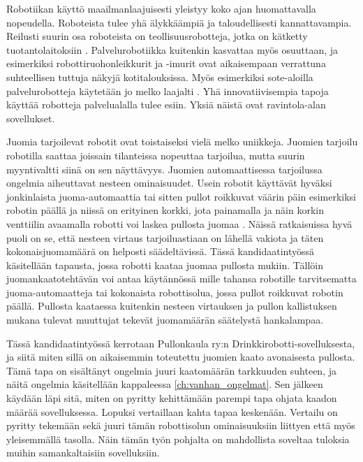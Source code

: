 Robotiikan käyttö maailmanlaajuisesti yleistyy koko ajan huomattavalla nopeudella. Roboteista tulee yhä älykkäämpiä ja taloudellisesti kannattavampia. Reilusti suurin osa roboteista on teollisuusrobotteja, jotka on kätketty tuotantolaitoksiin \cite{Heer2020}. Palvelurobotiikka kuitenkin kasvattaa myös osuuttaan, ja esimerkiksi robottiruohonleikkurit ja -imurit ovat aikaisempaan verrattuna suhteellisen tuttuja näkyjä kotitalouksissa. Myös esimerkiksi sote-aloilla palvelurobotteja käytetään jo melko laajalti \cite{Jyvaskylanyliopisto2018}. Yhä innovatiivisempia tapoja käyttää robotteja palvelualalla tulee esiin. Yksiä näistä ovat ravintola-alan sovellukset.

Juomia tarjoilevat robotit ovat toistaiseksi vielä melko uniikkeja. Juomien tarjoilu robotilla saattaa joissain tilanteissa nopeuttaa tarjoilua, mutta suurin myyntivaltti siinä on sen näyttävyys. Juomien automaattisessa tarjoilussa ongelmia aiheuttavat nesteen ominaisuudet. Usein robotit käyttävät hyväksi jonkinlaista juoma-automaattia \cite{Kelly2020} tai sitten pullot roikkuvat väärin päin esimerkiksi robotin päällä ja niissä on erityinen korkki, jota painamalla ja näin korkin venttiilin avaamalla robotti voi laskea pullosta juomaa \cite{Ro2016}. Näissä ratkaisuissa hyvä puoli on se, että nesteen virtaus tarjoiluastiaan on lähellä vakiota ja täten kokonaisjuomamäärä on helposti säädeltävissä. Tässä kandidaatintyössä käsitellään tapausta, jossa robotti kaataa juomaa pullosta mukiin. Tällöin juomankaatotehtävän voi antaa käytännössä mille tahansa robotille tarvitsematta juoma-automaatteja tai kokonaista robottisolua, jossa pullot roikkuvat robotin päällä. Pullosta kaataessa kuitenkin nesteen virtauksen ja pullon kallistuksen mukana tulevat muuttujat tekevät juomamäärän säätelystä hankalampaa.

Tässä kandidaatintyössä kerrotaan Pullonkaula ry:n Drinkkirobotti-sovelluksesta, ja siitä miten sillä on aikaisemmin toteutettu juomien kaato avonaisesta pullosta. Tämä tapa on sisältänyt ongelmia juuri kaatomäärän tarkkuuden suhteen, ja näitä ongelmia käsitellään kappaleessa \ref{ch:vanhan_ongelmat}. Sen jälkeen käydään läpi sitä, miten on pyritty kehittämään parempi tapa ohjata kaadon määrää sovelluksessa. Lopuksi vertaillaan kahta tapaa keskenään. Vertailu on pyritty tekemään sekä juuri tämän robottisolun ominaisuuksiin liittyen että myös yleisemmällä tasolla. Näin tämän työn pohjalta on mahdollista soveltaa tuloksia muihin samankaltaisiin sovelluksiin.
